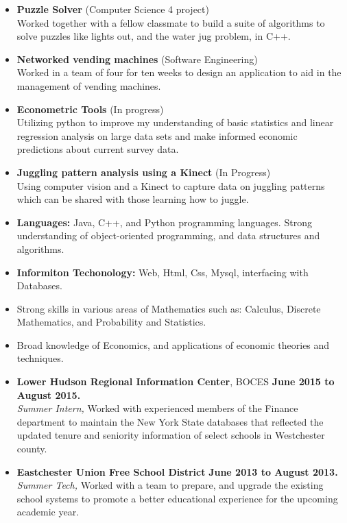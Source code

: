 \documentclass[10pt]{article}
\begin{document}
\begin{itemize}[topsep=.5ex, itemsep=0ex, partopsep=0ex, parsep=1ex]
	\item[] {\bf Puzzle Solver} (Computer Science 4 project)\\
	Worked together with a fellow classmate to build a suite of algorithms to solve puzzles like lights out, and the water jug problem, in C++.
	\item[] {\bf Networked vending machines} (Software Engineering)\\
	Worked in a team of four for ten weeks to design an application to aid in the management of vending machines.
	\item[] {\bf Econometric Tools} (In progress)\\
	Utilizing python to improve my understanding of basic statistics and linear regression analysis on large data sets and make informed economic predictions about current survey data.
	\item[] {\bf Juggling pattern analysis using a Kinect} (In Progress)\\
	Using computer vision and a Kinect to capture data on juggling patterns which can be shared with those learning how to juggle.
\end{itemize}
\vspace{1ex}
\begin{itemize} [topsep=.5ex, itemsep=0ex, partopsep=0ex, parsep=1ex]
	\item[] {\bf Languages:} Java, C++, and Python programming languages. Strong understanding of object-oriented programming, and data structures and algorithms.
 	\item[] {\bf Informiton Techonology:} Web, Html, Css, Mysql, interfacing with Databases.
 	\item[] Strong skills in various areas of Mathematics such as: Calculus, Discrete Mathematics, and Probability and Statistics.
	\item[] Broad knowledge of Economics, and applications of economic theories and techniques.
\end{itemize}
\vspace{1ex}
\begin{itemize} [topsep=.5ex, itemsep=0ex, partopsep=0ex, parsep=1ex]
	\item[]{{\bf Lower Hudson Regional Information Center}, BOCES \hfill {\bf June 2015 to August 2015.}}\\
	{\it Summer Intern,}
	Worked with experienced members of the Finance department to maintain the New York
	State databases that reflected the updated tenure and seniority information of select schools in Westchester county.
	\item[]{{\bf Eastchester Union Free School District} \hfill { \bf June 2013 to August 2013.}}\\
		{\it Summer Tech,}
		{Worked with a team to prepare, and upgrade the existing school systems to promote a better educational experience for the upcoming academic year.}
\end{itemize}
\end{document}
